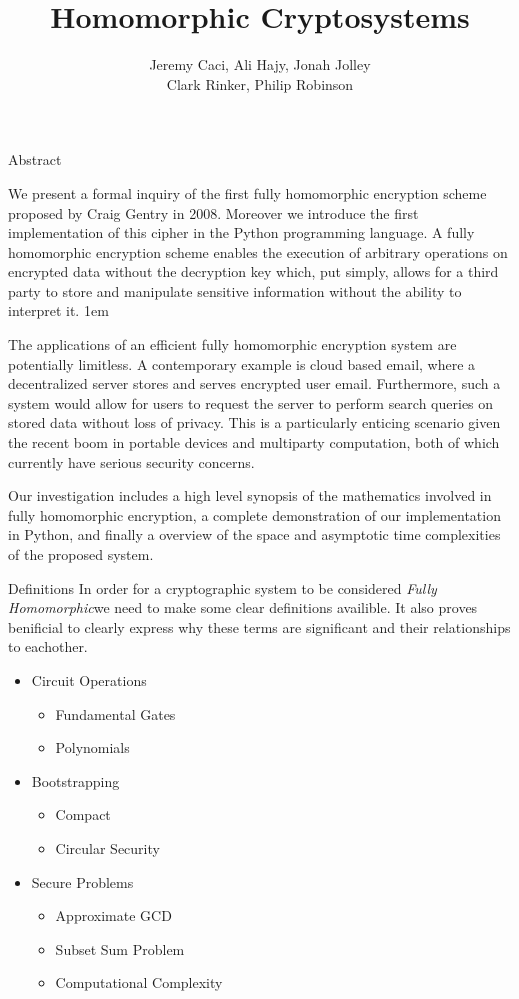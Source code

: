 \documentclass[a0,portrait]{a0poster}
\title{Homomorphic Cryptosystems}
\author{
Jeremy Caci, Ali Hajy, Jonah Jolley\\
Clark Rinker, Philip Robinson
}
\begin{document}
\maketitle

\def\fh{{\em Fully Homomorphic\xspace}}

\begin{multicols}{2}
\begin{slide}{Abstract}

We present a formal inquiry of the first fully homomorphic encryption scheme proposed by Craig Gentry in 2008. Moreover we introduce the first implementation of this cipher in the Python programming language. A fully homomorphic encryption scheme enables the execution of arbitrary operations on encrypted data without the decryption key which, put simply, allows for a third party to  store and manipulate sensitive information without the ability to interpret it. 
\parskip 1em

The applications of an efficient fully homomorphic encryption system are potentially limitless. A contemporary example is cloud based email, where a decentralized server stores and serves encrypted user email. Furthermore, such a system would allow for users to request the server to perform search queries on stored data without loss of privacy. This is a particularly enticing scenario given the recent boom in portable devices and multiparty computation, both of which currently have serious security concerns. 

Our investigation includes a high level synopsis of the mathematics involved in fully homomorphic encryption, a complete demonstration of our implementation in Python, and finally a overview of the space and asymptotic time complexities of the proposed system. 

\end{slide}

\begin{slide}{Definitions}
In order for a cryptographic system to be considered \fh we need to make some clear definitions availible. It also proves benificial to clearly express why these terms are significant and their relationships to eachother. 

\begin{itemize}
\item Circuit Operations
\begin{itemize}
\item Fundamental Gates
\item Polynomials
\end{itemize}
\item Bootstrapping
\begin{itemize}
\item Compact
\item Circular Security
\end{itemize}
\item Secure Problems
\begin{itemize}
\item Approximate GCD
\item Subset Sum Problem
\item Computational Complexity
\end{itemize}


\end{itemize}
\end{slide}
\end{multicols}
\end{document}
